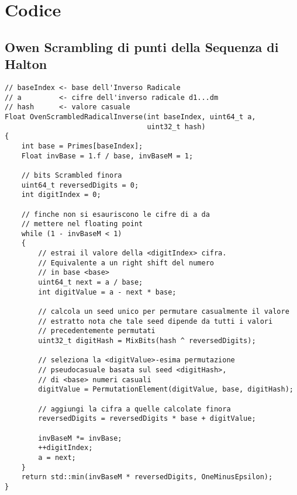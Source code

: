 \chapter{Codice}
\section{Owen Scrambling di punti della Sequenza di Halton}\label{appendixD:owenScrambling}
\begin{verbatim}
// baseIndex <- base dell'Inverso Radicale
// a         <- cifre dell'inverso radicale d1...dm
// hash      <- valore casuale
Float OvenScrambledRadicalInverse(int baseIndex, uint64_t a, 
                                  uint32_t hash)
{
	int base = Primes[baseIndex];
	Float invBase = 1.f / base, invBaseM = 1;

	// bits Scrambled finora
	uint64_t reversedDigits = 0;
	int digitIndex = 0;

	// finche non si esauriscono le cifre di a da 
	// mettere nel floating point
	while (1 - invBaseM < 1)
	{
		// estrai il valore della <digitIndex> cifra.
		// Equivalente a un right shift del numero
		// in base <base>
		uint64_t next = a / base;
		int digitValue = a - next * base;

		// calcola un seed unico per permutare casualmente il valore 
		// estratto nota che tale seed dipende da tutti i valori 
		// precedentemente permutati
		uint32_t digitHash = MixBits(hash ^ reversedDigits);

		// seleziona la <digitValue>-esima permutazione 
		// pseudocasuale basata sul seed <digitHash>, 
		// di <base> numeri casuali
		digitValue = PermutationElement(digitValue, base, digitHash);

		// aggiungi la cifra a quelle calcolate finora
		reversedDigits = reversedDigits * base + digitValue;

		invBaseM *= invBase;
		++digitIndex;
		a = next;
	}
	return std::min(invBaseM * reversedDigits, OneMinusEpsilon);
}
\end{verbatim}
